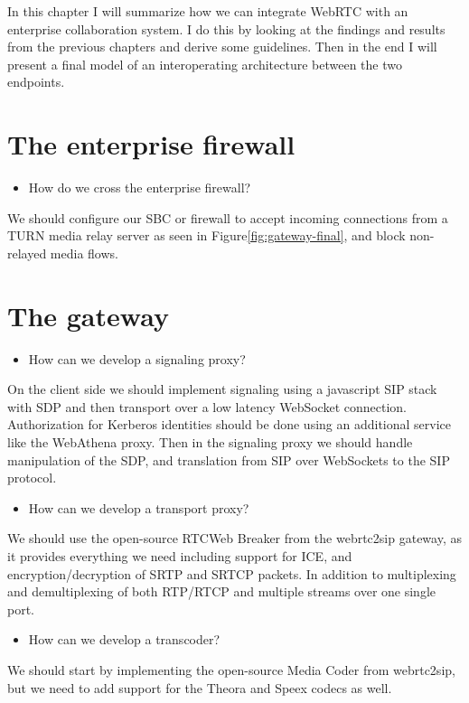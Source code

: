 In this chapter I will summarize how we can integrate WebRTC with an enterprise collaboration system. I do this by looking at the findings and results from the previous chapters and derive some guidelines. Then in the end I will present a final model of an interoperating architecture between the two endpoints.

\section{The enterprise firewall}

\begin{itemize}
\item How do we cross the enterprise firewall?
\end{itemize}
We should configure our SBC or firewall to accept incoming connections from a TURN media relay server as seen in Figure\ref{fig:gateway-final}, and block non-relayed media flows.

\section{The gateway}

\begin{itemize}
\item How can we develop a signaling proxy?
\end{itemize}
On the client side we should implement signaling using a javascript SIP stack with SDP and then transport over a low latency WebSocket connection. Authorization for Kerberos identities should be done using an additional service like the WebAthena proxy. Then in the signaling proxy we should handle manipulation of the SDP, and translation from SIP over WebSockets to the SIP protocol.

\begin{itemize}
\item How can we develop a transport proxy?
\end{itemize}
We should use the open-source RTCWeb Breaker from the webrtc2sip gateway, as it provides everything we need including support for ICE, and encryption/decryption of SRTP and SRTCP packets. In addition to multiplexing and demultiplexing of both RTP/RTCP and multiple streams over one single port.

\begin{itemize}
\item How can we develop a transcoder?
\end{itemize}
We should start by implementing the open-source Media Coder from webrtc2sip, but we need to add support for the Theora and Speex codecs as well.

